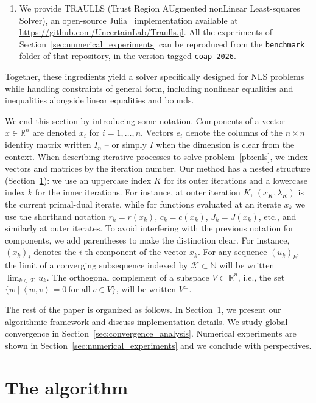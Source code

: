 \documentclass{article}
\numberwithin{equation}{section}
\newcommand{\RR}{{\mathbb{R}}} %
\newcommand{\NN}{{\mathbb{N}}} %
\newcommand{\calK}{{\mathcal{K}}}
\newcommand{\inner}[2]{\left\langle {#1} , {#2} \right\rangle} %
\theoremstyle{plain}
\begin{document}
\begin{enumerate}[label=(\roman*), leftmargin=*, itemsep=2pt]
	\item We provide TRAULLS (Trust Region AUgmented nonLinear Least-squares Solver), an open-source Julia~\cite{bezanson-etal:2017} implementation available at \url{https://github.com/UncertainLab/Traulls.jl}. All the experiments of Section~\ref{sec:numerical_experiments} can be reproduced from the \texttt{benchmark} folder of that repository, in the version tagged \texttt{coap-2026}.
\end{enumerate}
Together, these ingredients yield a solver specifically designed for NLS problems while handling constraints of general form, including nonlinear equalities and inequalities alongside linear equalities and bounds.

We end this section by introducing some notation. Components of a vector $x\in\RR^n$ are denoted $x_i$ for $i=1,\ldots,n$. Vectors $e_i$ denote the columns of the $n \times n$ identity matrix written $I_n$ -- or simply $I$ when the dimension is clear from the context. When describing iterative processes to solve problem~\eqref{pb:cnls}, we index vectors and matrices by the iteration number. Our method has a nested structure (Section~\ref{sec:algorithm}): we use an uppercase index $K$ for its outer iterations and a lowercase index $k$ for the inner iterations. For instance, at outer iteration $K$, $(x_K,\lambda_K)$ is the current primal-dual iterate, while for functions evaluated at an iterate $x_k$ we use the shorthand notation $r_k = r(x_k)$, $c_k =c(x_k)$, $J_k=J(x_k)$, etc., and similarly at outer iterates. To avoid interfering with the previous notation for components, we add parentheses to make the distinction clear. For instance, $(x_k)_i$ denotes the $i$-th component of the vector $x_k$. For any sequence $(u_k)_k$, the limit of a converging subsequence indexed by $\calK \subset \NN$ will be written $\lim_{k \in \calK} u_k$. The orthogonal complement of a subspace $V \subset \RR^n$, i.e., the set $\{ w\ | \ \inner{w}{v}=0\ \text{for all}\ v \in V\}$, will be written $V^\perp$.

	The rest of the paper is organized as follows. In Section~\ref{sec:algorithm}, we present our algorithmic framework and discuss implementation details. We study global convergence in Section~\ref{sec:convergence_analysis}. Numerical experiments are shown in Section~\ref{sec:numerical_experiments} and we conclude with perspectives.

	
	\section{The algorithm}\label{sec:algorithm}
\end{document}
